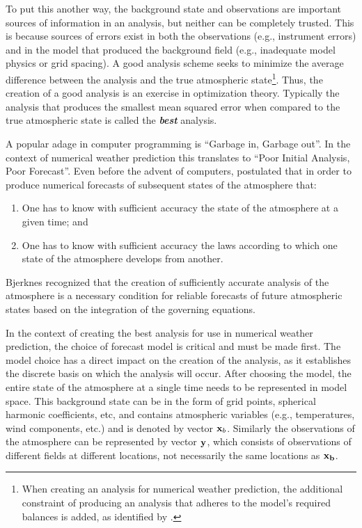 \noindent To put this another way, the background state and observations are important sources of information in an analysis, but neither can be completely trusted. This is because sources of errors exist in both the observations (e.g., instrument errors) and in the model that produced the background field (e.g., inadequate model physics or grid spacing). A good analysis scheme seeks to minimize the average difference between the analysis and the true atmospheric state\footnote{When creating an analysis for numerical weather prediction, the additional constraint of producing an analysis that adheres to the model's required balances is added, as identified by \cite{gilchrist1954oban}.}. Thus, the creation of a good analysis is an exercise in optimization theory. Typically the analysis that produces the smallest mean squared error when compared to the true atmospheric state is called the \emph{\textbf{best}} analysis.


A popular adage in computer programming is ``Garbage in, Garbage out''. In the context of numerical weather prediction this translates to ``Poor Initial Analysis, Poor Forecast''. Even before the advent of computers, \cite{bjerknes1904nwpvision} postulated that in order to produce numerical forecasts of subsequent states of the atmosphere that:


\begin{blockquote}
    \begin{enumerate}
        \item One has to know with sufficient accuracy the state of the atmosphere at a given time; and
        \item One has to know with sufficient accuracy the laws according to which one state of the atmosphere develops from another.
    \end{enumerate}
\end{blockquote}


\noindent Bjerknes recognized that the creation of sufficiently accurate analysis of the atmosphere is a necessary condition for reliable forecasts of future atmospheric states based on the integration of the governing equations.


In the context of creating the best analysis for use in numerical weather prediction, the choice of forecast model is critical and must be made first. The model choice has a direct impact on the creation of the analysis, as it establishes the discrete basis on which the analysis will occur. After choosing the model, the entire state of the atmosphere at a single time needs to be represented in model space. This background state can be in the form of grid points, spherical harmonic coefficients, etc, and contains atmospheric variables (e.g., temperatures, wind components, etc.) and is denoted by vector $\mathbf{x}_b$. Similarly the observations of the atmosphere can be represented by vector $\mathbf{y}$, which consists of observations of different fields at different locations, not necessarily the same locations as $\mathbf{x_b}$.


